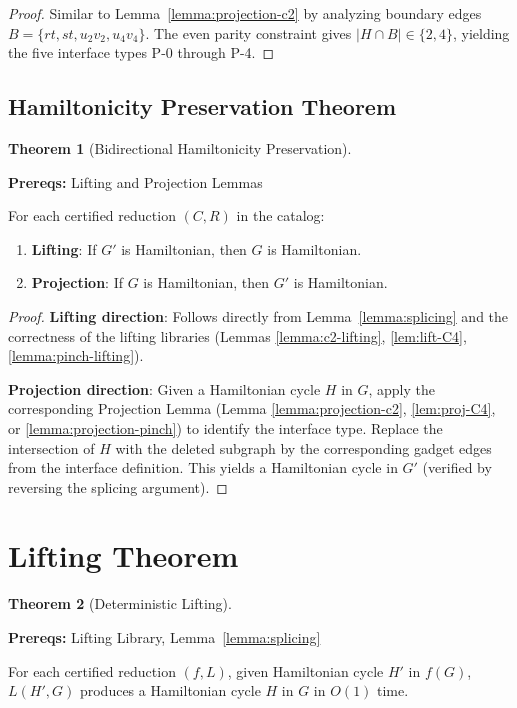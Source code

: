 \documentclass[12pt]{article}
\theoremstyle{definition}
\newtheorem{theorem}{Theorem}
\newcommand{\prereq}[1]{\par\noindent\textbf{Prereqs:} #1\par}
\begin{document}
\begin{proof}
Similar to Lemma~\ref{lemma:projection-c2} by analyzing boundary edges $B = \{rt, st, u_2v_2, u_4v_4\}$. The even parity constraint gives $|H \cap B| \in \{2,4\}$, yielding the five interface types P-0 through P-4.
\end{proof}



\subsection{Hamiltonicity Preservation Theorem}
\label{subsec:hamiltonicity-preservation}

\begin{theorem}[Bidirectional Hamiltonicity Preservation]
\label{thm:bidirectional-hamiltonicity}
\prereq{Lifting and Projection Lemmas}
For each certified reduction $(C, R)$ in the catalog:
\begin{enumerate}
    \item \textbf{Lifting}: If $G'$ is Hamiltonian, then $G$ is Hamiltonian.
    \item \textbf{Projection}: If $G$ is Hamiltonian, then $G'$ is Hamiltonian.
\end{enumerate}
\end{theorem}

\begin{proof}
\textbf{Lifting direction}: Follows directly from Lemma~\ref{lemma:splicing} and the correctness of the lifting libraries (Lemmas \ref{lemma:c2-lifting}, \ref{lem:lift-C4}, \ref{lemma:pinch-lifting}).

\textbf{Projection direction}: Given a Hamiltonian cycle $H$ in $G$, apply the corresponding Projection Lemma (Lemma \ref{lemma:projection-c2}, \ref{lem:proj-C4}, or \ref{lemma:projection-pinch}) to identify the interface type. Replace the intersection of $H$ with the deleted subgraph by the corresponding gadget edges from the interface definition. This yields a Hamiltonian cycle in $G'$ (verified by reversing the splicing argument).
\end{proof}

\section{Lifting Theorem}
\label{sec:lifting-theorem}

\begin{theorem}[Deterministic Lifting]
\label{thm:lifting}
\prereq{Lifting Library, Lemma~\ref{lemma:splicing}}
For each certified reduction $(f, L)$, given Hamiltonian cycle $H'$ in $f(G)$, 
$L(H', G)$ produces a Hamiltonian cycle $H$ in $G$ in $O(1)$ time.
\end{theorem}
\end{document}
